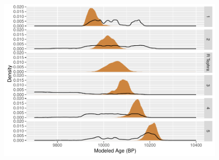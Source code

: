 \documentclass{beamer} %
\begin{document}
\begin{frame}
	
	\begin{figure}
	\includegraphics[width=\textwidth]{tephstack}
	\end{figure}
	

\end{frame}




\printbibliography
\end{document}
